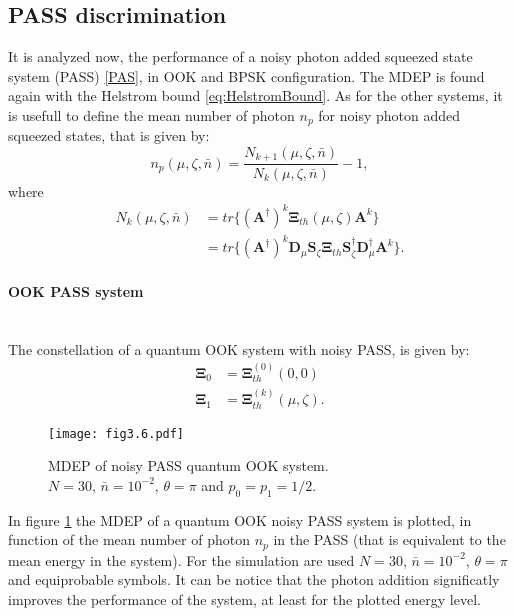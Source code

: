     \subsection{PASS discrimination}
        It is analyzed now, the performance of a noisy photon added squeezed state system (PASS)
        \ref{PAS}, in OOK and BPSK configuration. The MDEP is found again with the Helstrom bound
        \ref{eq:HelstromBound}.
        As for the other systems, it is usefull to define the mean number of photon $n_p$ for noisy 
        photon added squeezed states, that is given by:
        \begin{equation}
            n_p(\mu,\zeta,\bar{n}) = \frac{N_{k+1}(\mu,\zeta,\bar{n})}{N_k(\mu,\zeta,\bar{n})}-1,
            \label{eq:np_PASS}
        \end{equation}
        where
        \begin{equation}
            \begin{split}
                N_k(\mu,\zeta,\bar{n}) &= tr\{(\pmb{A}^\dagger)^k \pmb{\Xi}_{th}(\mu,\zeta) \pmb{A}^k\}\\
                                       &= tr\{(\pmb{A}^\dagger)^k \pmb{D}_\mu \pmb{S}_\zeta \pmb{\Xi}_{th}
                                        \pmb{S}_\zeta^\dagger \pmb{D}_\mu^\dagger \pmb{A}^k\}.
            \end{split}
        \end{equation}

        \paragraph{OOK PASS system}\mbox{}\\
        The constellation of a quantum OOK system with noisy PASS, is given by:
        \begin{equation}
            \begin{split}
                \pmb{\Xi}_0 &= \pmb{\Xi}_{th}^{(0)}(0,0)\\
                \pmb{\Xi}_1 &= \pmb{\Xi}_{th}^{(k)}(\mu,\zeta).
            \end{split}
        \end{equation}
        \begin{figure}[ht]
            \begin{center}
                \texttt{[image: fig3.6.pdf]}
                \caption{MDEP of noisy PASS quantum OOK system.\\
                $N=30$, $\bar{n}=10^{-2}$, $\theta=\pi$ and $p_0=p_1=1/2$.}
                \label{fig:3.6}
            \end{center}
        \end{figure}
        In figure \ref{fig:3.6} the MDEP of a quantum OOK noisy PASS system is plotted, in function
        of the mean number of photon $n_p$ in the PASS (that is equivalent to the mean energy
        in the system). For the simulation are used $N=30$, $\bar{n}=10^{-2}$, $\theta=\pi$ and
        equiprobable symbols.
        It can be notice that the photon addition significatly improves the performance of the system,
        at least for the plotted energy level.

